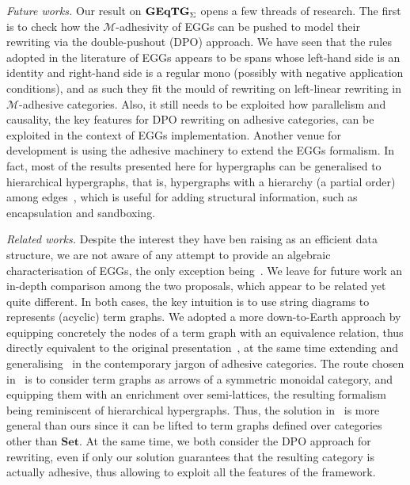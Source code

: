 \documentclass[a4paper,UKenglish,cleveref,pdftex,thm-restate,numberwithinsect]{lipics-v2021}
\newcommand{\Set}{\mathbf{Set}}
\newcommand{\catname}[1]{\textbf{\textup{#1}}}
\newcommand{\GEqTGs}{\catname{GEqTG}_{\Sigma}}
\begin{document}
\emph{Future works.}
Our result on $\GEqTGs$ opens a few threads of research. The first is to check how the $\mathcal{M}$-adhesivity 
of EGGs can be pushed to model their rewriting via the double-pushout (DPO) approach. We have seen that 
the rules adopted in the literature of EGGs appears to be spans whose left-hand side is an identity and 
right-hand side is a regular mono (possibly with negative application 
conditions), and as such they fit the mould of rewriting on left-linear rewriting in $\mathcal{M}$-adhesive categories. 
%
Also, it still needs to be exploited how parallelism and causality, the key features for DPO rewriting
on adhesive categories, can be exploited in the context of EGGs implementation. 
Another venue for development is using the adhesive 
machinery to extend the EGGs formalism. In fact, most of the results
presented here for hypergraphs can be generalised to hierarchical hypergraphs, that is, 
hypergraphs with a hierarchy (a partial order) among 
edges~\cite{ghicaZan,CastelnovoGM24}, which is useful for adding structural information, such as encapsulation and sandboxing.

\emph{Related works.}
Despite the interest they have ben raising as an efficient data structure, we are not aware of any attempt to provide an 
algebraic characterisation of EGGs, the only exception being~\cite{ghica}. We leave for future work an in-depth comparison 
among the two proposals, which appear to be related yet quite different.
%
In both cases, the key intuition is  to use string diagrams to represents (acyclic) term graphs. We adopted a
more down-to-Earth approach by equipping
concretely the nodes of a term graph with an equivalence relation, thus directly equivalent to the original presentation~\cite{DetlefsNS05},
at the same time extending and generalising~\cite{concur2006} in the contemporary jargon of adhesive categories.
The route chosen in~\cite{ghica} is to consider term graphs as arrows of a symmetric monoidal category,
and equipping them with an enrichment over semi-lattices, the resulting formalism being reminiscent of hierarchical hypergraphs.
Thus, the solution in~\cite{ghica}  is  more general than ours since it can be lifted to term graphs defined over categories other than
$\Set$.
%
At the same time, we both consider the DPO approach for rewriting, even if only our solution guarantees that the resulting category
is actually adhesive, thus allowing to exploit all the features of the framework.
\end{document}
